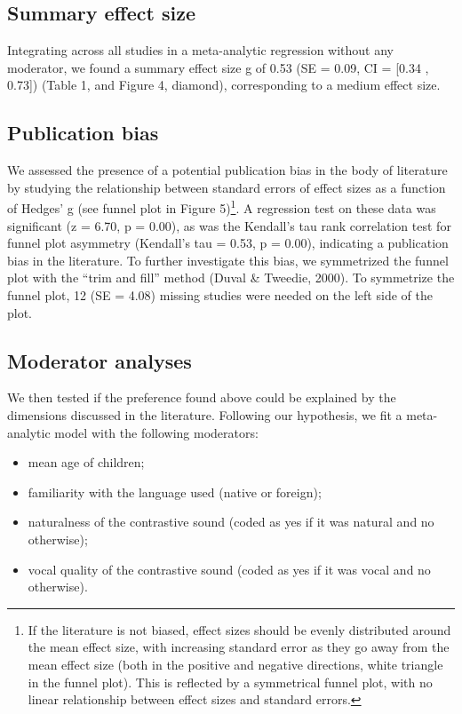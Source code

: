 \documentclass[man]{apa6}
\providecommand{\tightlist}{%
  \setlength{\itemsep}{0pt}\setlength{\parskip}{0pt}}
\let\rmarkdownfootnote\footnote%
\def\footnote{\protect\rmarkdownfootnote}
\begin{document}
\subsection{Summary effect size}\label{summary-effect-size}

Integrating across all studies in a meta-analytic regression without any
moderator, we found a summary effect size g of 0.53 (SE = 0.09, CI =
{[}0.34 , 0.73{]}) (Table 1, and Figure 4, diamond), corresponding to a
medium effect size.

\subsection{Publication bias}\label{publication-bias}

We assessed the presence of a potential publication bias in the body of
literature by studying the relationship between standard errors of
effect sizes as a function of Hedges' g (see funnel plot in Figure
5)\footnote{If the literature is not biased, effect sizes should be
  evenly distributed around the mean effect size, with increasing
  standard error as they go away from the mean effect size (both in the
  positive and negative directions, white triangle in the funnel plot).
  This is reflected by a symmetrical funnel plot, with no linear
  relationship between effect sizes and standard errors.}. A regression
test on these data was significant (z = 6.70, p = 0.00), as was the
Kendall's tau rank correlation test for funnel plot asymmetry (Kendall's
tau = 0.53, p = 0.00), indicating a publication bias in the literature.
To further investigate this bias, we symmetrized the funnel plot with
the \enquote{trim and fill} method (Duval \& Tweedie, 2000). To
symmetrize the funnel plot, 12 (SE = 4.08) missing studies were needed
on the left side of the plot.

\subsection{Moderator analyses}\label{moderator-analyses}

We then tested if the preference found above could be explained by the
dimensions discussed in the literature. Following our hypothesis, we fit
a meta-analytic model with the following moderators:

\begin{itemize}
\tightlist
\item
  mean age of children;
\item
  familiarity with the language used (native or foreign);
\item
  naturalness of the contrastive sound (coded as yes if it was natural
  and no otherwise);
\item
  vocal quality of the contrastive sound (coded as yes if it was vocal
  and no otherwise).
\end{itemize}
\end{document}
